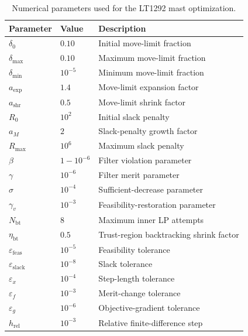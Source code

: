 \documentclass[11pt,a4paper]{article}
\begin{document}
\begin{table}[h]
\centering
\small
\begin{tabular}{lll}
\toprule
Parameter & Value & Description \\
\midrule
$\delta_0$                         & $0.10$        & Initial move-limit fraction \\
$\delta_{\max}$                    & $0.10$        & Maximum move-limit fraction \\
$\delta_{\min}$                    & $10^{-5}$     & Minimum move-limit fraction \\
$a_{\mathrm{exp}}$                 & $1.4$         & Move-limit expansion factor \\
$a_{\mathrm{shr}}$                 & $0.5$         & Move-limit shrink factor \\
$R_0$                              & $10^{2}$      & Initial slack penalty \\
$a_M$                              & $2$           & Slack-penalty growth factor \\
$R_{\max}$                         & $10^{6}$      & Maximum slack penalty \\
$\beta$                            & $1-10^{-6}$   & Filter violation parameter \\
$\gamma$                           & $10^{-6}$     & Filter merit parameter \\
$\sigma$                           & $10^{-4}$     & Sufficient-decrease parameter \\
$\gamma_v$                         & $10^{-3}$     & Feasibility-restoration parameter \\
$N_{\mathrm{bt}}$                  & $8$           & Maximum inner LP attempts \\
$\eta_{\mathrm{bt}}$               & $0.5$         & Trust-region backtracking shrink factor \\
$\varepsilon_{\mathrm{feas}}$      & $10^{-5}$     & Feasibility tolerance \\
$\varepsilon_{\mathrm{slack}}$     & $10^{-8}$     & Slack tolerance \\
$\varepsilon_x$                    & $10^{-4}$     & Step-length tolerance \\
$\varepsilon_f$                    & $10^{-3}$     & Merit-change tolerance \\
$\varepsilon_g$                    & $10^{-6}$     & Objective-gradient tolerance \\
$h_{\mathrm{rel}}$                 & $10^{-3}$     & Relative finite-difference step \\
\bottomrule
\end{tabular}
\caption{Numerical parameters used for the LT1292 mast optimization.}
\label{tab:slp_settings}
\end{table}
\end{document}
